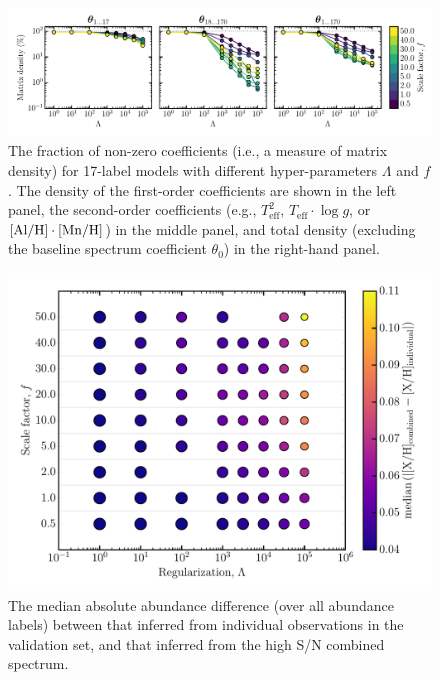 \documentclass[12pt,preprint]{aastex}
\newcommand{\logg}{\log g}
\newcommand{\Teff}{T_{\mathrm{eff}}}
\begin{document}
\clearpage

\begin{figure}[p]
\centering
\includegraphics[width=\textwidth]{sparsity.pdf}
\caption{The fraction of non-zero coefficients (i.e., a measure of matrix density) for 17-label models with different hyper-parameters $\Lambda$ and $f$.  The density of the first-order coefficients are shown in the left panel, the second-order coefficients (e.g., $\Teff^2$, $\Teff\cdot\logg$, or $[\rm{Al}/\rm{H}]\cdot[\rm{Mn}/\rm{H}]$) in the middle panel, and total density (excluding the baseline spectrum coefficient $\theta_0$) in the right-hand panel.\label{fig:sparsity}}
\end{figure}


\begin{figure}[p]
\centering
\includegraphics[width=\textwidth]{gs-mad-all-elements.pdf}
\caption{The median absolute abundance difference (over all abundance labels)
between that inferred from individual observations in the validation set, and
that inferred from the high S/N combined spectrum.
\label{fig:gridsearch-mad-all-elements}}
\end{figure}
\end{document}
